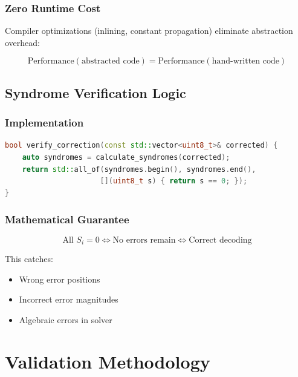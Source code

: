 \documentclass[11pt,a4paper]{article}
\begin{document}
\subsubsection{Zero Runtime Cost}

Compiler optimizations (inlining, constant propagation) eliminate abstraction overhead:

\begin{equation}
\text{Performance}(\text{abstracted code}) = \text{Performance}(\text{hand-written code})
\end{equation}

\subsection{Syndrome Verification Logic}

\subsubsection{Implementation}

\begin{lstlisting}[language=C++, basicstyle=\small\ttfamily]
bool verify_correction(const std::vector<uint8_t>& corrected) {
    auto syndromes = calculate_syndromes(corrected);
    return std::all_of(syndromes.begin(), syndromes.end(),
                      [](uint8_t s) { return s == 0; });
}
\end{lstlisting}

\subsubsection{Mathematical Guarantee}

\begin{equation}
\text{All } S_i = 0 \iff \text{No errors remain} \iff \text{Correct decoding}
\end{equation}

This catches:
\begin{itemize}
    \item Wrong error positions
    \item Incorrect error magnitudes
    \item Algebraic errors in solver
\end{itemize}

\newpage
\section{Validation Methodology}
\end{document}
